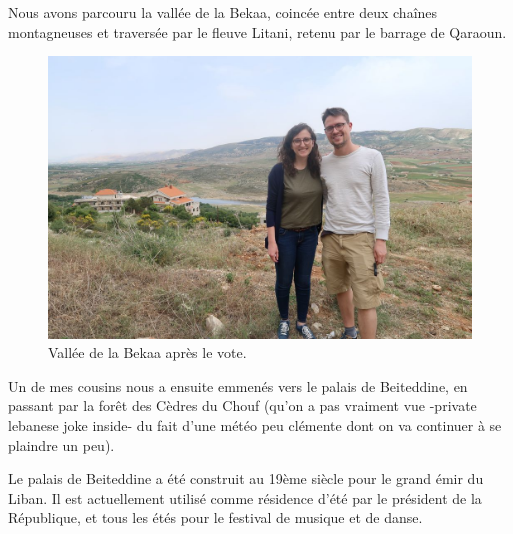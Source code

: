 Nous avons parcouru la vallée de la Bekaa, coincée entre deux chaînes
montagneuses et traversée par le fleuve Litani, retenu par le barrage de
Qaraoun.

\begin{figure}
\centering
\includegraphics{images/20180517_bekaa.jpg}
\caption{Vallée de la Bekaa après le vote.}
\end{figure}

Un de mes cousins nous a ensuite emmenés vers le palais de Beiteddine,
en passant par la forêt des Cèdres du Chouf (qu'on a pas vraiment vue
-private lebanese joke inside- du fait d'une météo peu clémente dont on
va continuer à se plaindre un peu).

Le palais de Beiteddine a été construit au 19ème siècle pour le grand
émir du Liban. Il est actuellement utilisé comme résidence d'été par le
président de la République, et tous les étés pour le festival de musique
et de danse.


